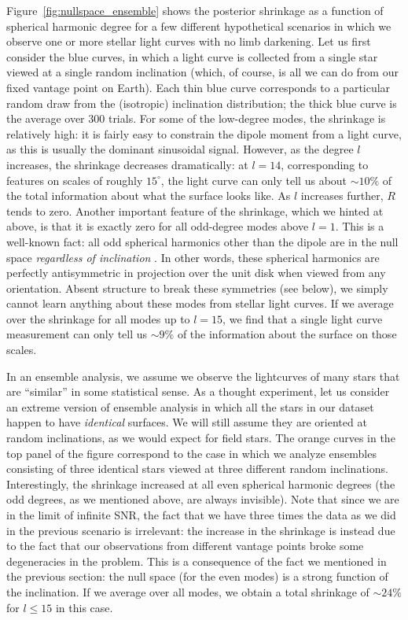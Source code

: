\documentclass[modern]{aastex62}
\begin{document}
Figure~\ref{fig:nullspace_ensemble} shows the posterior shrinkage
as a function of spherical harmonic degree for a few different hypothetical
scenarios in which we observe one or more stellar light curves with
no limb darkening.
Let us first consider the blue curves, in which a light curve is
collected from a single star viewed at a single random inclination (which, of course, is
all we can do from our fixed vantage point on Earth).
Each thin blue curve corresponds to a particular random draw from the (isotropic)
inclination distribution; the thick blue curve is the average over 300 trials.
For some of the low-degree modes, the shrinkage is relatively high: it is
fairly easy to constrain the dipole moment from a light curve, as this is
usually the dominant sinusoidal signal. However, as the degree $l$
increases, the shrinkage decreases dramatically: at $l = 14$, corresponding
to features on scales of roughly $15^\circ$, the light curve
can only tell us about $\sim 10\%$ of the total information about what the
surface looks like. As $l$ increases further, $R$ tends to zero.
Another important feature of the shrinkage, which we hinted at above,
is that it is exactly zero for
all odd-degree modes above $l = 1$. This is a well-known fact: all odd spherical
harmonics other than the dipole are in the null space \emph{regardless of
    inclination} \citep[e.g.,][]{Luger2019}. In other words, these spherical
harmonics are perfectly antisymmetric in projection over the unit disk
when viewed from any orientation. Absent structure to break these symmetries
(see below), we simply cannot learn anything about these modes from
stellar light curves. If we average over the shrinkage for all modes up to $l=15$,
we find that a single light curve measurement can only tell us $\sim 9\%$
of the information about the surface on those scales.

In an ensemble analysis, we assume we observe the lightcurves of many stars
that are ``similar'' in some statistical sense. As a thought experiment,
let us consider an extreme version of ensemble analysis in which all the
stars in our dataset happen to have \emph{identical} surfaces. We will
still assume they are oriented at random inclinations, as we would expect for
field stars. The orange curves in the top panel of the figure correspond to
the case in which we analyze ensembles consisting of three identical stars
viewed at three different random inclinations.
Interestingly, the shrinkage increased at all even spherical harmonic degrees
(the odd degrees, as we mentioned above, are always invisible).
Note that since we are in the limit of infinite SNR, the fact that we have
three times the data as we did in the previous scenario is irrelevant: the
increase in the shrinkage is instead due to the fact that our observations
from different vantage points broke some degeneracies in the problem.
This is a consequence of the fact we mentioned in the previous section:
the null space (for the even modes)
is a strong function of the inclination.
If we average over all modes, we obtain a total shrinkage of $\sim 24\%$
for $l\leq15$ in this case.
\end{document}

